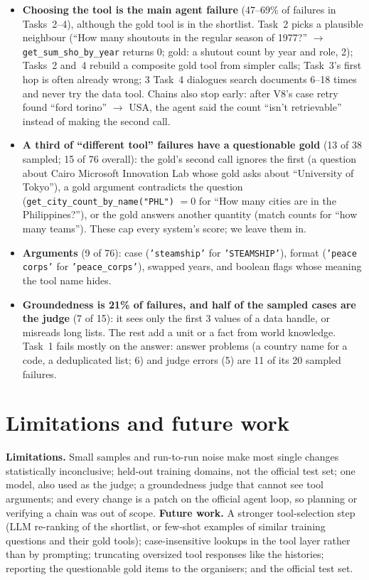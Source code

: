 \documentclass[10pt]{article}
\begin{document}
\begin{itemize}
\item \textbf{Choosing the tool is the main agent failure} (47--69\% of failures in Tasks~2--4),
  although the gold tool is in the shortlist. Task~2 picks a plausible neighbour (``How many
  shoutouts in the regular season of 1977?'' $\rightarrow$ \texttt{get\_sum\_sho\_by\_year} returns 0;
  gold: a shutout count by year and role, 2); Tasks~2 and~4 rebuild a composite gold tool from
  simpler calls; Task~3's first hop is often already wrong; 3 Task~4 dialogues search documents
  6--18 times and never try the data tool. Chains also stop early: after V8's case retry found
  ``ford torino'' $\rightarrow$ USA, the agent said the count ``isn't retrievable'' instead of
  making the second call.
\item \textbf{A third of ``different tool'' failures have a questionable gold} (13 of 38 sampled;
  15 of 76 overall): the gold's second call ignores the first (a question about Cairo Microsoft
  Innovation Lab whose gold asks about ``University of Tokyo''), a gold argument contradicts the
  question (\texttt{get\_city\_count\_by\_name("PHL")} $=0$ for ``How many cities are in the
  Philippines?''), or the gold answers another quantity (match counts for ``how many teams'').
  These cap every system's score; we leave them in.
\item \textbf{Arguments} (9 of 76): case (\texttt{'steamship'} for \texttt{'STEAMSHIP'}), format
  (\texttt{'peace corps'} for \texttt{'peace\_corps'}), swapped years, and boolean flags whose
  meaning the tool name hides.
\item \textbf{Groundedness is 21\% of failures, and half of the sampled cases are the judge} (7 of
  15): it sees only the first 3 values of a data handle, or misreads long lists. The rest add a unit
  or a fact from world knowledge. Task~1 fails mostly on the answer: answer problems (a country name
  for a code, a deduplicated list; 6) and judge errors (5) are 11 of its 20 sampled failures.
\end{itemize}

\section{Limitations and future work}
\textbf{Limitations.} Small samples and run-to-run noise make most single changes statistically
inconclusive; held-out training domains, not the official test set; one model, also used as the
judge; a groundedness judge that cannot see tool arguments; and every change is a patch on the
official agent loop, so planning or verifying a chain was out of scope. \textbf{Future work.} A
stronger tool-selection step (LLM re-ranking of the shortlist, or few-shot examples of similar
training questions and their gold tools); case-insensitive lookups in the tool layer rather than
by prompting; truncating oversized tool responses like the histories; reporting the questionable
gold items to the organisers; and the official test set.
\end{document}
